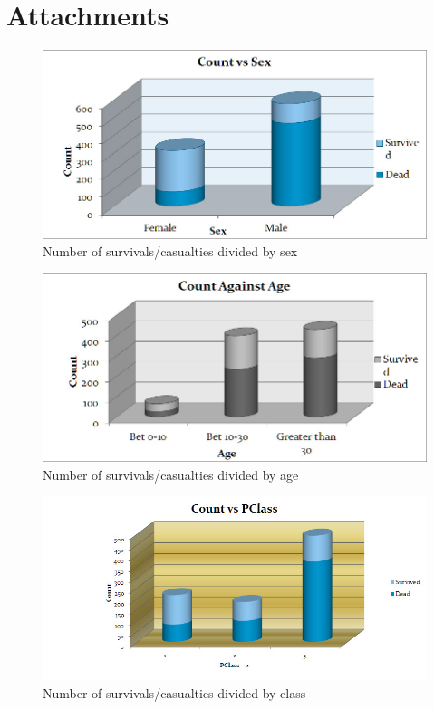 \documentclass[12pt,a4paper]{article}
\begin{document}
\section{Attachments}
\begin{figure}[h]
\begin{center}
\includegraphics[scale=0.45]{../figures/Sex-vs-Survival.jpg}
\caption{Number of survivals/casualties divided by sex}
\label{sex}
\end{center}
\end{figure}

\begin{figure}
\begin{center}
\includegraphics[scale=0.45]{../figures/Age-vs-Survival.jpg}
\caption{Number of survivals/casualties divided by age}
\label{age}
\end{center}
\end{figure}

\begin{figure}
\begin{center}
\includegraphics[scale=0.5]{../figures/PClass-vs-Survival.jpg}
\caption{Number of survivals/casualties divided by class}
\label{class}
\end{center}
\end{figure}
\end{document}

